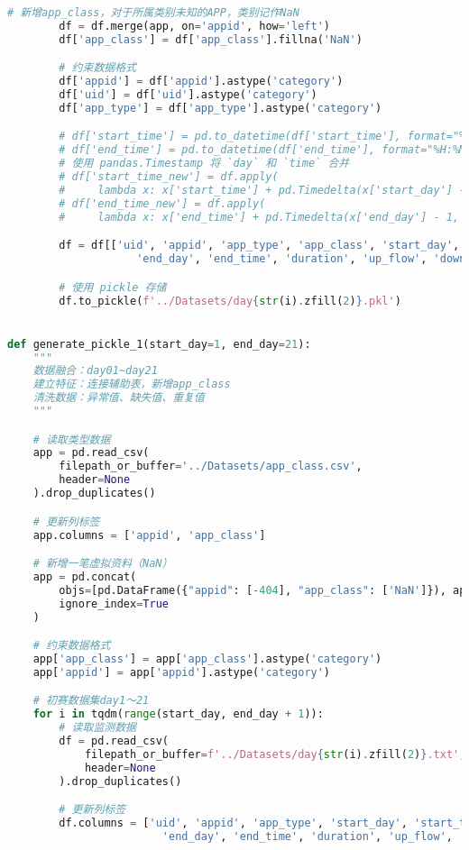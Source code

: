 \documentclass[withoutpreface,bwprint]{cumcmthesis}
\begin{document}
\begin{appendices}
\begin{lstlisting}[language=Python]
        # 新增app_class，对于所属类别未知的APP，类别记作NaN
        df = df.merge(app, on='appid', how='left')
        df['app_class'] = df['app_class'].fillna('NaN')

        # 约束数据格式
        df['appid'] = df['appid'].astype('category')
        df['uid'] = df['uid'].astype('category')
        df['app_type'] = df['app_type'].astype('category')

        # df['start_time'] = pd.to_datetime(df['start_time'], format="%H:%M:%S")
        # df['end_time'] = pd.to_datetime(df['end_time'], format="%H:%M:%S")
        # 使用 pandas.Timestamp 将 `day` 和 `time` 合并
        # df['start_time_new'] = df.apply(
        #     lambda x: x['start_time'] + pd.Timedelta(x['start_day'] - 1, unit='D'), axis=1)
        # df['end_time_new'] = df.apply(
        #     lambda x: x['end_time'] + pd.Timedelta(x['end_day'] - 1, unit='D'), axis=1)

        df = df[['uid', 'appid', 'app_type', 'app_class', 'start_day', 'start_time',
                    'end_day', 'end_time', 'duration', 'up_flow', 'down_flow']]

        # 使用 pickle 存储
        df.to_pickle(f'../Datasets/day{str(i).zfill(2)}.pkl')


def generate_pickle_1(start_day=1, end_day=21):
    """
    数据融合：day01~day21
    建立特征：连接辅助表，新增app_class
    清洗数据：异常值、缺失值、重复值
    """

    # 读取类型数据
    app = pd.read_csv(
        filepath_or_buffer='../Datasets/app_class.csv',
        header=None
    ).drop_duplicates()

    # 更新列标签
    app.columns = ['appid', 'app_class']

    # 新增一笔虚拟资料（NaN）
    app = pd.concat(
        objs=[pd.DataFrame({"appid": [-404], "app_class": ['NaN']}), app],
        ignore_index=True
    )

    # 约束数据格式
    app['app_class'] = app['app_class'].astype('category')
    app['appid'] = app['appid'].astype('category')

    # 初赛数据集day1～21
    for i in tqdm(range(start_day, end_day + 1)):
        # 读取监测数据
        df = pd.read_csv(
            filepath_or_buffer=f'../Datasets/day{str(i).zfill(2)}.txt',
            header=None
        ).drop_duplicates()

        # 更新列标签
        df.columns = ['uid', 'appid', 'app_type', 'start_day', 'start_time',
                        'end_day', 'end_time', 'duration', 'up_flow', 'down_flow']


\end{lstlisting}
\end{appendices}
\end{document}
